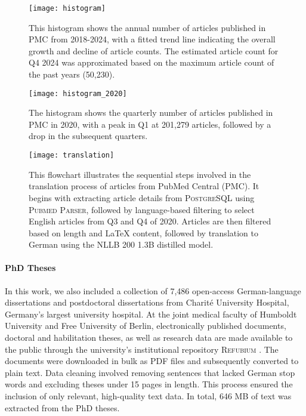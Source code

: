\begin{figure}[htbp]
    \centering
    \texttt{[image: histogram]}
    \caption[Distribution of PMC articles from 2018-2024]{This histogram shows
    the annual number of articles published in PMC from 2018-2024, with a fitted
    trend line indicating the overall growth and decline of article counts. The
    estimated article count for Q4 2024 was approximated based on the maximum
    article count of the past years (50,230).}
    \label{fig:histogram}
\end{figure}
\begin{figure}[htbp]
    \centering
    \texttt{[image: histogram\_2020]}
    \caption[Quarterly distribution of PMC articles in 2020]{The histogram
    shows the quarterly number of articles published in PMC in 2020, with a
    peak in Q1 at 201,279 articles, followed by a drop in the subsequent
    quarters.}
    \label{fig:histogram_2020}
\end{figure}

\begin{figure}[p]
    \centering
    \texttt{[image: translation]}
    \caption[Flowchart of the PMC translation process]{This flowchart
    illustrates the sequential steps involved in the translation process of
    articles from PubMed Central (PMC). It begins with extracting article
    details from \textsc{PostgreSQL} using \textsc{Pubmed Parser}, followed by
    language-based filtering to select English articles from Q3 and Q4 of 2020.
    Articles are then filtered based on length and \LaTeX{} content, followed by
    translation to German using the NLLB 200 1.3B distilled model.}
    \label{fig:translation}
\end{figure}


\paragraph{PhD Theses} 
In this work, we also included a collection of 7,486 open-access German-language
dissertations and postdoctoral dissertations from Charité University Hospital,
Germany's largest university hospital. At the joint medical faculty of Humboldt
University and Free University of Berlin, electronically published documents,
doctoral and habilitation theses, as well as research data are made available to
the public through the university's institutional repository \textsc{Refubium}
\cite{refubium}. The documents were downloaded in bulk as PDF files and
subsequently converted to plain text. Data cleaning involved removing sentences
that lacked German stop words and excluding theses under 15 pages in length.
This process ensured the inclusion of only relevant, high-quality text data. In
total, 646 MB of text was extracted from the PhD theses.


